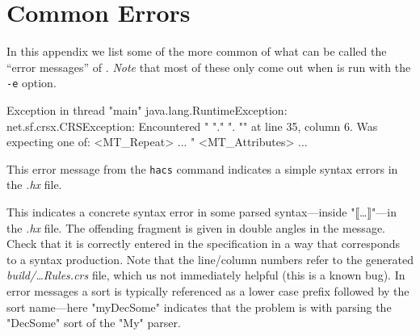 \documentclass[11pt]{article} %
\begin{document}


\section{Common Errors}\label{app:errors}

In this appendix we list some of the more common of what can be called the ``error messages'' of
\HAX. \emph{Note} that most of these only come out when \HAX is run with the \verb'-e' option.

\begin{error}\leavevmode
\begin{code}
Exception in thread "main" java.lang.RuntimeException: net.sf.crsx.CRSException:
 Encountered " "." ". "" at line 35, column 6.
Was expecting one of:
    <MT_Repeat> ...
    "%
    <MT_Attributes> ...
\end{code}
This error message from the \verb'hacs' command indicates a simple syntax errors in the \emph{.hx}
file.
\end{error}

\begin{error}\leavevmode
{}
  This indicates a concrete syntax error in some parsed syntax---inside "⟦…⟧"---in the \emph{.hx}
  file. The offending fragment is given in double angles in the message. Check that it is correctly
  entered in the \HAX specification in a way that corresponds to a syntax production. Note that the
  line/column numbers refer to the generated \emph{build/…Rules.crs} file, which us not immediately
  helpful (this is a known bug). In error messages a sort is typically referenced as a lower case
  prefix followed by the sort name---here "myDecSome" indicates that the problem is with parsing the
  "DecSome" sort of the "My" parser.
\end{error}
\end{document}

